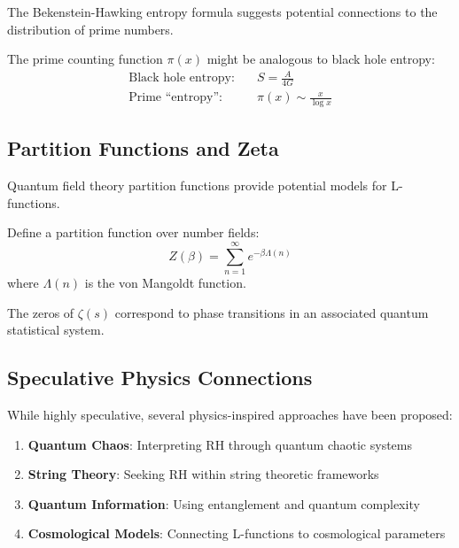 The Bekenstein-Hawking entropy formula suggests potential connections to the distribution of prime numbers.

\begin{analogy}
\label{analogy:prime_entropy}
The prime counting function $\pi(x)$ might be analogous to black hole entropy:
\begin{align}
\text{Black hole entropy:} \quad & S = \frac{A}{4G} \\
\text{Prime ``entropy'':} \quad & \pi(x) \sim \frac{x}{\log x}
\label{eq:prime_entropy_analogy}
\end{align}
\end{analogy}

\subsection{Partition Functions and Zeta}

Quantum field theory partition functions provide potential models for L-functions.

\begin{definition}
\label{def:nt_partition_function}
Define a partition function over number fields:
\begin{equation}
Z(\beta) = \sum_{n=1}^{\infty} e^{-\beta \Lambda(n)}
\label{eq:nt_partition_function}
\end{equation}
where $\Lambda(n)$ is the von Mangoldt function.
\end{definition}

\begin{conjecture}
\label{conj:quantum_statistical_rh}
The zeros of $\zeta(s)$ correspond to phase transitions in an associated quantum statistical system.
\end{conjecture}

\subsection{Speculative Physics Connections}

While highly speculative, several physics-inspired approaches have been proposed:

\begin{enumerate}
\item \textbf{Quantum Chaos}: Interpreting RH through quantum chaotic systems
\item \textbf{String Theory}: Seeking RH within string theoretic frameworks
\item \textbf{Quantum Information}: Using entanglement and quantum complexity
\item \textbf{Cosmological Models}: Connecting L-functions to cosmological parameters
\end{enumerate}

